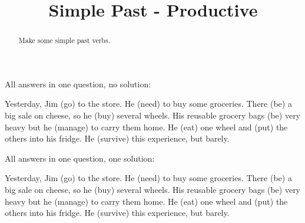 \documentclass{ximera}
\title{Simple Past - Productive}
\begin{document}
\begin{abstract}
Make some simple past verbs.
\end{abstract}
\maketitle

\begin{question}

All answers in one question, no solution:

Yesterday, Jim  (go) to the store. He  (need) to buy some groceries. There  (be) a big sale on cheese, so he  (buy) several wheels. His reusable grocery bags  (be) very heavy but he  (manage) to carry them home. He  (eat) one wheel and  (put) the others into his fridge. He  (survive) this experience, but barely.

\end{question}

\begin{question}
\begin{solution}

All answers in one question, one solution:

Yesterday, Jim  (go) to the store. He  (need) to buy some groceries. There  (be) a big sale on cheese, so he  (buy) several wheels. His reusable grocery bags  (be) very heavy but he  (manage) to carry them home. He  (eat) one wheel and  (put) the others into his fridge. He  (survive) this experience, but barely.

\end{solution}
\end{question}
\end{document}
